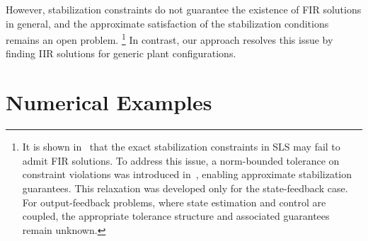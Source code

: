 However, stabilization constraints do not guarantee the existence of FIR solutions in general, and the approximate satisfaction of the stabilization conditions remains an open problem.
\footnote{%
It is shown in~\cite{wang2019SLS} that the exact stabilization constraints in SLS may fail to admit FIR solutions. To address this issue, a norm-bounded tolerance on constraint violations was introduced in~\cite{Matni2017SLS}, enabling approximate stabilization guarantees. This relaxation was developed only for the state-feedback case. For output-feedback problems, where state estimation and control are coupled, the appropriate tolerance structure and associated guarantees remain unknown.
}
In contrast, our approach resolves this issue by finding IIR solutions for generic plant configurations.

\section{Numerical Examples}
